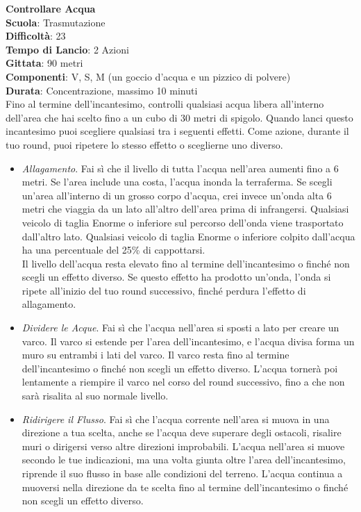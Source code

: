 \begin{multicols}{2}
\medskip\textbf{Controllare Acqua}\\
\textbf{Scuola}: Trasmutazione\\
\textbf{Difficoltà}: 23\\
\textbf{Tempo di Lancio}: 2 Azioni\\
\textbf{Gittata}: 90 metri\\
\textbf{Componenti}: V, S, M (un goccio d'acqua e un pizzico di polvere)\\
\textbf{Durata}: Concentrazione, massimo 10 minuti\\
Fino al termine dell'incantesimo, controlli qualsiasi acqua libera all'interno dell'area che hai scelto fino a un cubo di 30 metri di spigolo. Quando lanci questo incantesimo puoi scegliere qualsiasi tra i seguenti effetti. Come azione, durante il tuo round, puoi ripetere lo stesso effetto o sceglierne uno diverso.\\
\begin{itemize}
\item 
\textit{Allagamento}. Fai sì che il livello di tutta l'acqua nell'area aumenti fino a 6 metri. Se l'area include una costa, l'acqua inonda la terraferma. Se scegli un'area all'interno di un grosso corpo d'acqua, crei invece un'onda alta 6 metri che viaggia da un lato all'altro dell'area prima di infrangersi. Qualsiasi veicolo di taglia Enorme o inferiore sul percorso dell'onda viene trasportato dall'altro lato. Qualsiasi veicolo di taglia Enorme o inferiore colpito dall'acqua ha una percentuale del 25\% di cappottarsi.\\
Il livello dell'acqua resta elevato fino al termine dell'incantesimo o finché non scegli un effetto diverso. Se questo effetto ha prodotto un'onda, l'onda si ripete all'inizio del tuo round successivo, finché perdura l'effetto di allagamento.\\
\item 
\textit{Dividere le Acque}. Fai sì che l'acqua nell'area si sposti a lato per creare un varco. Il varco si estende per l'area dell'incantesimo, e l'acqua divisa forma un muro su entrambi i lati del varco. Il varco resta fino al termine dell'incantesimo o finché non scegli un effetto diverso. L'acqua tornerà poi lentamente a riempire il varco nel corso del round successivo, fino a che non sarà risalita al suo normale livello.
\item 
\textit{Ridirigere il Flusso}. Fai sì che l'acqua corrente nell'area si muova in una direzione a tua scelta, anche se l'acqua deve superare degli ostacoli, risalire muri o dirigersi verso altre direzioni improbabili. L'acqua nell'area si muove secondo le tue indicazioni, ma una volta giunta oltre l'area dell'incantesimo, riprende il suo flusso in base alle condizioni del terreno. L'acqua continua a muoversi nella direzione da te scelta fino al termine dell'incantesimo o finché non scegli un effetto diverso.

\end{itemize}
\end{multicols}
